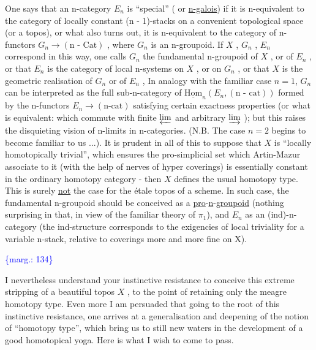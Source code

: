 \documentclass[11pt]{article}
\newcommand{\scanpage}[1]{\par\bigskip\noindent{\small\sffamily[scan #1]}\par}
\newcommand{\mspage}[1]{{\small\sffamily[p.\,#1]}}
\newcommand{\margin}[1]{\textcolor{blue}{\{\textsf{marg.:} #1\}}}
\newcommand{\uline}[1]{\underline{#1}}
\newcommand{\uuline}[1]{\underline{\underline{#1}}}
\begin{document}
One says that an n-category $E_n$ is ``special'' ( or \uline{n-galois}) if
it is n-equivalent to the category of locally constant (n - 1)-stacks
on a convenient topological space (or a topos), or what also turns
out, it is n-equivalent to the category of n-functors
$G_n \to (\text{n - Cat})$ , where $G_n$ is an n-groupoid. If $X$ , $G_n$ , $E_n$
correspond in this way, one calls $G_n$ the fundamental n-groupoid
of $X$ , or of $E_n$ , or that $E_n$ is the category of local n-systems
on $X$ , or on $G_n$ , or that $X$ is the geometric realisation of
$G_n$ or of $E_n$ , In analogy with the familiar case $n = 1$, $G_n$
can be interpreted as the full sub-n-category of $\underline{\mathrm{Hom}}_n(E_n,(\text{n - cat}))$
formed by the n-functors $E_n \to (\text{n-cat})$ satisfying certain
exactness properties (or what is equivalent: which commute with
finite $\varprojlim$ and arbitrary $\varinjlim$ ); but this raises the disquieting
vision of n-limits in n-categories. (N.B. The case $n = 2$ begins
to become familiar to us ...). It is prudent in all of this to
suppose that $X$ is ``locally homotopically trivial'', which ensures
the pro-simplicial set which Artin-Mazur associate to it (with
the help of nerves of hyper coverings) is essentially constant in
the ordinary homotopy category - then $X$ defines the usual
homotopy type. This is surely \uline{not} the case for the étale topos
of a scheme. In such case, the fundamental n-groupoid should be
conceived as a \uuline{pro}-\uline{n}-\uline{groupoid} (nothing surprising in that, in view
of the familiar theory of $\pi_1$), and $E_n$ as an (ind)-n-category
(the ind-structure corresponds to the exigencies of local triviality
for a variable n-stack, relative to coverings more and more fine on
X).

\margin{134}

\clearpage
\scanpage{134-2/134}
\mspage{- 7 -}

I nevertheless understand your instinctive resistance to
conceive this extreme stripping of a beautiful topos $X$ , to the
point of retaining only the meagre homotopy type. Even more I
am persuaded that going to the root of this instinctive resistance,
one arrives at a generalisation and deepening of the notion of
``homotopy type'', which bring us to still new waters in the
development of a good homotopical yoga. Here is what I wish to
come to pass.
\end{document}

